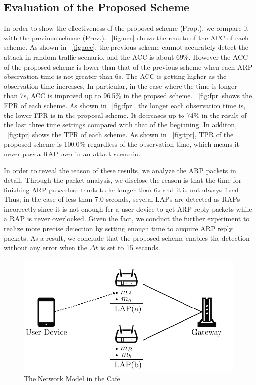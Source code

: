 \documentclass[conference]{IEEEtran}
\begin{document}
\subsection{Evaluation of the Proposed Scheme}
In order to show the effectiveness of the proposed scheme (Prop.), we compare it with the previous scheme \cite{previous} (Prev.).
\figurename~\ref{fig:acc} shows the results of the ACC of each scheme.
As shown in \figurename~\ref{fig:acc}, the previous scheme cannot accurately detect the attack in random traffic scenario, and the ACC is about 69\%.
However the ACC of the proposed scheme is lower than that of the previous scheme when each ARP observation time is not greater than 6s.
The ACC is getting higher as the observation time increases.
In particular, in the case where the time is longer than 7s, ACC is improved up to 96.5\% in the propsed scheme.
\figurename~\ref{fig:fpr} shows the FPR of each scheme.
As shown in \figurename~\ref{fig:fpr}, the longer each observation time is, the lower FPR is in the proposal scheme.
It decreases up to 74\% in the result of the last three time settings compared with that of the beginning.
In additon, \figurename~\ref{fig:tpr} shows the TPR of each scheme.
As shown in \figurename~\ref{fig:tpr}, TPR of the proposed scheme is 100.0\% regardless of the observation time, which means it never pass a RAP over in an attack scenario.

In order to reveal the reason of these results, we analyze the ARP packets in detail.
Through the packet analysis, we disclose the reason is that the time for finishing ARP procedure tends to be longer than 6s and it is not always fixed.
Thus, in the case of less than 7.0 seconds, several LAPs are detected as RAPs incorrectly since it is not enough for a user device to get ARP reply packets while a RAP is never overlooked.
Given the fact, we conduct the further experiment to realize more precise detection by setting enough time to auquire ARP reply packets.
As a result, we conclude that the proposed scheme enables the detection without any error when the $\Delta t$ is set to 15 seconds.
\begin{figure}[t]
    \begin{center}
        \includegraphics[scale=0.7]{starbucks/starbucks.pdf}
        \caption{The Network Model in the Cafe}
        \label{fig:sbx}
    \end{center}
\end{figure}
\end{document}
